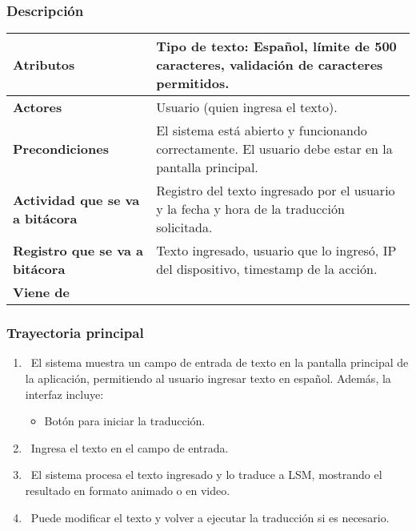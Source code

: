 \subsubsection{Descripción}
\begin{table}[h]
    \centering
    \begin{longtable}{|l|p{10cm}|}  %
    \hline
    \textbf{Atributos} & Tipo de texto: Español, límite de 500 caracteres, validación de caracteres permitidos. \\ \hline
    \textbf{Actores} & Usuario (quien ingresa el texto). \\ \hline
    \textbf{Precondiciones} & El sistema está abierto y funcionando correctamente. El usuario debe estar en la pantalla principal. \\ \hline
    \textbf{Actividad que se va a bitácora} & Registro del texto ingresado por el usuario y la fecha y hora de la traducción solicitada. \\ \hline
    \textbf{Registro que se va a bitácora} & Texto ingresado, usuario que lo ingresó, IP del dispositivo, timestamp de la acción. \\ \hline
    \textbf{Viene de} &  \\ \hline    
    \end{longtable}
\end{table}
    

\subsubsection{Trayectoria principal}
\begin{enumerate}[label=\textbf{\arabic*}, leftmargin=1.5cm]
    \item \UCsystem \ El sistema muestra un campo de entrada de texto en la pantalla principal de la aplicación, permitiendo al usuario ingresar texto en español.  
    Además, la interfaz incluye:  
    \begin{itemize}
        \item Botón para iniciar la traducción.
    \end{itemize}

    \item \UCactor \ Ingresa el texto en el campo de entrada.  
   
    \item \UCsystem \ El sistema procesa el texto ingresado y lo traduce a LSM, mostrando el resultado en formato animado o en video.

    \item \UCactor \ Puede modificar el texto y volver a ejecutar la traducción si es necesario.

\end{enumerate}

